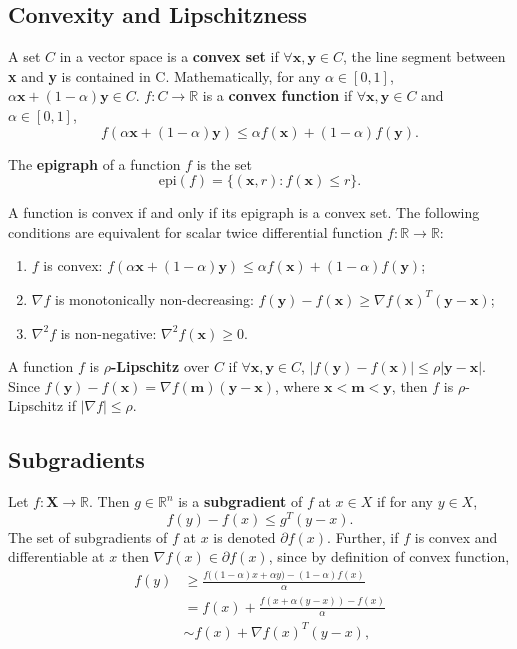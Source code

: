 \documentclass[../main.tex]{subfiles}
\begin{document}
\setlength{\parindent}{0pt}
\subsection{Convexity and Lipschitzness}
A set $C$ in a vector space is a \textbf{convex set} if $\forall \textbf{x}, \textbf{y} \in C$, the line segment between \textbf{x} and \textbf{y} is contained in C. Mathematically, for any $\alpha \in [0, 1]$, $\alpha\textbf{x} + (1-\alpha)\textbf{y} \in C$. $f: C\to \mathbb{R}$ is a \textbf{convex function} if $\forall \textbf{x}, \textbf{y}\in C$ and $\alpha \in[0, 1]$, $$f(\alpha\textbf{x}+(1-\alpha)\textbf{y})\leq \alpha f(\textbf{x})+(1-\alpha)f(\textbf{y}).$$

The \textbf{epigraph} of a function $f$ is the set $$\text{epi}(f)=\{(\textbf{x}, r): f(\textbf{x})\leq r\}.$$

A function is convex if and only if its epigraph is a convex set. The following conditions are equivalent for scalar twice differential function $f: \mathbb{R}\to \mathbb{R}$:
\begin{enumerate}
    \item $f$ is convex:  $f(\alpha\textbf{x}+(1-\alpha)\textbf{y})\leq \alpha f(\textbf{x})+(1-\alpha)f(\textbf{y})$;
    \item $\nabla f$ is monotonically non-decreasing: $f(\textbf{y})-f(\textbf{x})\geq \nabla f(\textbf{x})^T(\textbf{y}-\textbf{x})$;
    \item $\nabla^2f$ is non-negative: $\nabla^2f(\textbf{x})\geq 0$.
\end{enumerate}

A function $f$ is \textbf{$\rho$-Lipschitz} over $C$ if $\forall \textbf{x}, \textbf{y} \in C$, $|f(\textbf{y})-f(\textbf{x})|\leq \rho|\textbf{y}-\textbf{x}|$. Since $f(\textbf{y})-f(\textbf{x})=\nabla f(\textbf{m})(\textbf{y}-\textbf{x})$, where $\textbf{x}<\textbf{m}<\textbf{y}$, then $f$ is $\rho$-Lipschitz if $|\nabla f|\leq \rho$. 

\subsection{Subgradients}
Let $f: \textbf{X}\to \mathbb{R}$. Then $g\in \mathbb{R}^n$ is a \textbf{subgradient} of $f$ at $x\in X$ if for any $y\in X$, $$f(y)-f(x)\leq g^T(y-x).$$ The set of subgradients of $f$ at $x$ is denoted $\partial f(x)$. Further, if $f$ is convex and differentiable at $x$ then $\nabla f(x)\in \partial f(x)$, since by definition of convex function,
\begin{equation} \label{eq2-1}
\begin{split}
f(y) & \geq \frac{f\big( (1-\alpha)x+\alpha y\big)-(1-\alpha)f(x)}{\alpha} \\
 & = f(x)+\frac{f(x+\alpha(y-x))-f(x)}{\alpha} \\
 & \sim f(x)+\nabla f(x)^T(y-x),
\end{split}
\end{equation}
\end{document}
